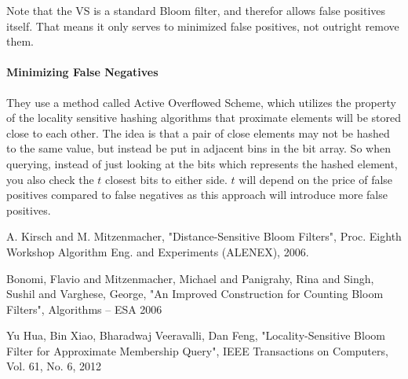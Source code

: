 \documentclass[a4paper,11pt]{article}
\begin{document}
Note that the VS is a standard Bloom filter, and therefor allows false positives itself. That means it only serves to minimized false positives, not outright remove them.

\paragraph{Minimizing False Negatives}
They use a method called Active Overflowed Scheme, which utilizes the property of the locality sensitive hashing algorithms that proximate elements will be stored close to each other. The idea is that a pair of close elements may not be hashed to the same value, but instead be put in adjacent bins in the bit array. So when querying, instead of just looking at the bits which represents the hashed element, you also check the $t$ closest bits to either side. $t$ will depend on the price of false positives compared to false negatives as this approach will introduce more false positives.

\begin{thebibliography}{}

A. Kirsch and M. Mitzenmacher, "Distance-Sensitive Bloom Filters", Proc. Eighth Workshop Algorithm Eng. and Experiments (ALENEX), 2006.

Bonomi, Flavio and Mitzenmacher, Michael and Panigrahy, Rina and Singh, Sushil and Varghese, George, "An Improved Construction for Counting Bloom Filters", Algorithms – ESA 2006 

Yu Hua, Bin Xiao, Bharadwaj Veeravalli, Dan Feng, "Locality-Sensitive Bloom Filter for Approximate Membership Query", IEEE Transactions on Computers, Vol. 61, No. 6, 2012
 
\end{thebibliography}
\end{document}
